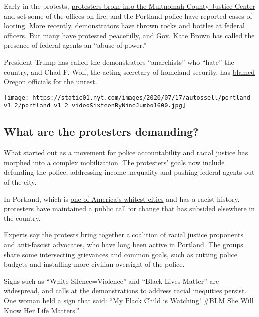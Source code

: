 Early in the protests,
\href{https://www.wweek.com/news/2020/05/30/video-portland-protesters-smash-windows-and-set-fires-in-multnomah-county-justice-center/}{protesters
broke into the Multnomah County Justice Center} and set some of the
offices on fire, and the Portland police have reported cases of looting.
More recently, demonstrators have thrown rocks and bottles at federal
officers. But many have protested peacefully, and Gov. Kate Brown has
called the presence of federal agents an ``abuse of power.''

President Trump has called the demonstrators ``anarchists'' who ``hate''
the country, and Chad F. Wolf, the acting secretary of homeland
security, has
\href{https://www.nytimes.com/2020/07/21/us/politics/homeland-security-portland-oregon.html}{blamed
Oregon officials} for the unrest.

\texttt{[image: https://static01.nyt.com/images/2020/07/17/autossell/portland-v1-2/portland-v1-2-videoSixteenByNineJumbo1600.jpg]}

\hypertarget{what-are-the-protesters-demanding}{%
\subsection{What are the protesters
demanding?}\label{what-are-the-protesters-demanding}}

What started out as a movement for police accountability and racial
justice has morphed into a complex mobilization. The protesters' goals
now include defunding the police, addressing income inequality and
pushing federal agents out of the city.

In Portland, which is
\href{https://www.nytimes.com/2020/07/24/us/portland-oregon-protests-white-race.html}{one
of America's whitest cities} and has a racist history, protesters have
maintained a public call for change that has subsided elsewhere in the
country.

\href{https://www.nytimes.com/2020/07/24/us/portland-oregon-protests-white-race.html}{Experts
say} the protests bring together a coalition of racial justice
proponents and anti-fascist advocates, who have long been active in
Portland. The groups share some intersecting grievances and common
goals, such as cutting police budgets and installing more civilian
oversight of the police.

Signs such as ``White Silence=Violence'' and ``Black Lives Matter'' are
widespread, and calls at the demonstrations to address racial inequities
persist. One woman held a sign that said: ``My Black Child is Watching!
\#BLM She Will Know Her Life Matters.''


